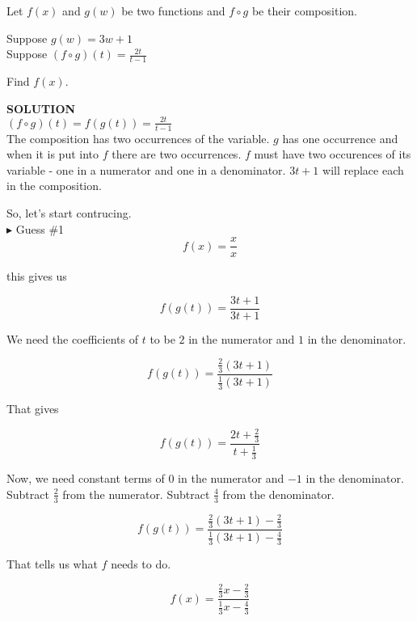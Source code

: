 \documentclass{ximera}
\begin{document}
\begin{example}


Let $f(x)$ and $g(w)$ be two functions and $f \circ g$ be their composition.


Suppose $g(w) = 3w + 1$ \\

Suppose $(f \circ g)(t) = \frac{2t}{t-1}$


Find $f(x)$.



\textbf{\textcolor{purple!50!blue!90!black}{SOLUTION}} \\




$(f \circ g)(t) =  f(g(t)) =  \frac{2t}{t-1}$ \\



The composition has two occurrences of the variable.  $g$ has one occurrence and when it is put into $f$ there are two occurrences.  $f$ must have two occurences of its variable - one in a numerator and one in a denominator.  $3t + 1$ will replace each in the composition.

So, let's start contrucing. \\


$\blacktriangleright$  Guess \#1 \\

\[      f(x) = \frac{x}{x}       \]


this gives us

\[   f(g(t)) =      \frac{3t + 1}{3t + 1}       \]



We need the coefficients of $t$ to be $2$ in the numerator and $1$ in the denominator.


\[   f(g(t)) =      \frac{\frac{2}{3}(3t + 1)}{\frac{1}{3}(3t + 1)}       \]

That gives


\[   f(g(t)) =      \frac{2t + \frac{2}{3}}{t + \frac{1}{3}}       \]



Now, we need constant terms of $0$ in the numerator and $-1$ in the denominator.  Subtract $\frac{2}{3}$ from the numerator. Subtract $\frac{4}{3}$ from the denominator.




\[   f(g(t)) =      \frac{\frac{2}{3}(3t + 1) - \frac{2}{3}}{\frac{1}{3}(3t + 1) - \frac{4}{3}}       \]

That tells us what $f$ needs to do.




\[   f(x) =      \frac{\frac{2}{3}x - \frac{2}{3}}{\frac{1}{3}x - \frac{4}{3}}       \]



\end{example}
\end{document}
